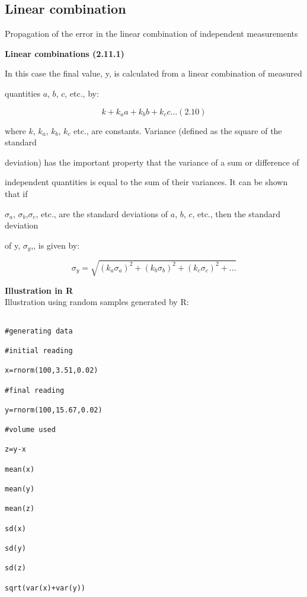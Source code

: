  

\subsection{Linear combination}

Propagation of the error in the linear combination of independent measurements

 

\noindent \textbf{Linear combinations (2.11.1)}

 

In this case the final value, y, is calculated from a linear combination of measured

quantities $a$, $b$, $c$, etc., by:

\[k +k_aa+k_bb+k_cc\ldots (2.10)\]

where $k$, $k_a$, $k_b$, $k_c$ etc., are constants. Variance (defined as the square of the standard

deviation) has the important property that the variance of a sum or difference of

independent quantities is equal to the sum of their variances. It can be shown that if

$\sigma_a$, $\sigma_b$,$\sigma_c$, etc., are the standard deviations of $a$, $b$, $c$, etc., then the standard deviation

of y, $\sigma_y$,, is given by:

\[ \sigma_y = \sqrt{(k_a\sigma_a)^2 + (k_b\sigma_b)^2 + (k_c\sigma_c)^2 + \ldots}\]

 

\textbf{Illustration in R}\\

Illustration using random samples generated by R:

\begin{verbatim}

#generating data

#initial reading

x=rnorm(100,3.51,0.02)

#final reading

y=rnorm(100,15.67,0.02)

#volume used

z=y-x

mean(x)

mean(y)

mean(z)

sd(x)

sd(y)

sd(z)

sqrt(var(x)+var(y))

\end{verbatim}

